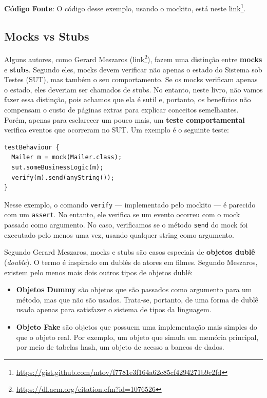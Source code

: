 \documentclass[
  11pt,
  twoside]{book}
\newcommand{\passthrough}[1]{#1}
\DeclareRobustCommand{\href}[2]{#2\footnote{\url{#1}}}
\begin{document}
\textbf{Código Fonte}: O código desse exemplo, usando o mockito, está
neste
\href{https://gist.github.com/mtov/f7781e3f164a62c85cf4294271b9c2fd}{link}.

\hypertarget{mocks-vs-stubs}{%
\subsection{Mocks vs Stubs}\label{mocks-vs-stubs}}

 

 Alguns autores, como Gerard Meszaros
(\href{https://dl.acm.org/citation.cfm?id=1076526}{link}), fazem uma
distinção entre \textbf{mocks} e \textbf{stubs}. Segundo eles, mocks
devem verificar não apenas o estado do Sistema sob Testes (SUT), mas
também o seu comportamento. Se os mocks verificam apenas o estado, eles
deveriam ser chamados de stubs. No entanto, neste livro, não vamos fazer
essa distinção, pois achamos que ela é sutil e, portanto, os benefícios
não compensam o custo de páginas extras para explicar conceitos
semelhantes. Porém, apenas para esclarecer um pouco mais, um
\textbf{teste comportamental} verifica eventos que ocorreram no SUT. Um
exemplo é o seguinte teste:

\begin{lstlisting}
testBehaviour {
  Mailer m = mock(Mailer.class);
  sut.someBusinessLogic(m);
  verify(m).send(anyString());
}
\end{lstlisting}

Nesse exemplo, o comando \passthrough{\lstinline!verify!} ---
implementado pelo mockito --- é parecido com um
\passthrough{\lstinline!assert!}. No entanto, ele verifica se um evento
ocorreu com o mock passado como argumento. No caso, verificamos se o
método \passthrough{\lstinline!send!} do mock foi executado pelo menos
uma vez, usando qualquer string como argumento.

  Segundo Gerard
Meszaros, mocks e stubs são casos especiais de \textbf{objetos dublê}
(\emph{double}). O termo é inspirado em dublês de atores em filmes.
Segundo Meszaros, existem pelo menos mais dois outros tipos de objetos
dublê:

\begin{itemize}
\item
  \textbf{Objetos Dummy} são objetos que são passados como argumento
  para um método, mas que não são usados. Trata-se, portanto, de uma
  forma de dublê usada apenas para satisfazer o sistema de tipos da
  linguagem.
\item
  \textbf{Objeto Fake} são objetos que possuem uma implementação mais
  simples do que o objeto real. Por exemplo, um objeto que simula em
  memória principal, por meio de tabelas hash, um objeto de acesso a
  bancos de dados.
\end{itemize}
\end{document}
